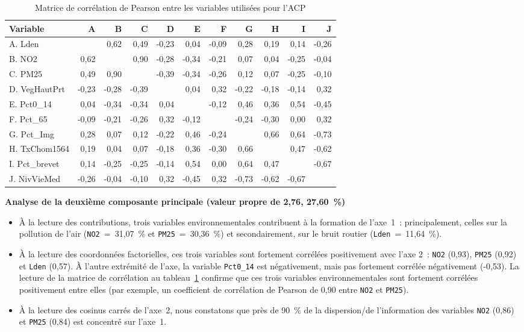 \documentclass[
  11pt,
  french,
]{book}
\providecommand{\tightlist}{%
  \setlength{\itemsep}{0pt}\setlength{\parskip}{0pt}}
\begin{document}
\begin{table}

\caption{\label{tab:dataacpMatriceCorr}Matrice de corrélation de Pearson entre les variables utilisées pour l'ACP}
\centering
\fontsize{8}{10}\selectfont
\begin{tabular}[t]{lrrrrrrrrrr}
\toprule
Variable & A & B & C & D & E & F & G & H & I & J\\
\midrule
A. Lden &  & 0,62 & 0,49 & -0,23 & 0,04 & -0,09 & 0,28 & 0,19 & 0,14 & -0,26\\
B. NO2 & 0,62 &  & 0,90 & -0,28 & -0,34 & -0,21 & 0,07 & 0,04 & -0,25 & -0,04\\
C. PM25 & 0,49 & 0,90 &  & -0,39 & -0,34 & -0,26 & 0,12 & 0,07 & -0,25 & -0,10\\
D. VegHautPrt & -0,23 & -0,28 & -0,39 &  & 0,04 & 0,32 & -0,22 & -0,18 & -0,14 & 0,32\\
E. Pct0\_14 & 0,04 & -0,34 & -0,34 & 0,04 &  & -0,12 & 0,46 & 0,36 & 0,54 & -0,45\\
\addlinespace
F. Pct\_65 & -0,09 & -0,21 & -0,26 & 0,32 & -0,12 &  & -0,24 & -0,30 & 0,00 & 0,32\\
G. Pct\_Img & 0,28 & 0,07 & 0,12 & -0,22 & 0,46 & -0,24 &  & 0,66 & 0,64 & -0,73\\
H. TxChom1564 & 0,19 & 0,04 & 0,07 & -0,18 & 0,36 & -0,30 & 0,66 &  & 0,47 & -0,62\\
I. Pct\_brevet & 0,14 & -0,25 & -0,25 & -0,14 & 0,54 & 0,00 & 0,64 & 0,47 &  & -0,67\\
J. NivVieMed & -0,26 & -0,04 & -0,10 & 0,32 & -0,45 & 0,32 & -0,73 & -0,62 & -0,67 & \\
\bottomrule
\end{tabular}
\end{table}

\textbf{Analyse de la deuxième composante principale (valeur propre de 2,76, 27,60~\%)}

\begin{itemize}
\tightlist
\item
  À la lecture des contributions, trois variables environnementales contribuent à la formation de l'axe~1~: principalement, celles sur la pollution de l'air (\texttt{NO2}~=~31,07~\% et \texttt{PM25}~=~30,36~\%) et secondairement, sur le bruit routier (\texttt{Lden}~=~11,64~\%).
\item
  À la lecture des coordonnées factorielles, ces trois variables sont fortement corrélées positivement avec l'axe 2~: \texttt{NO2} (0,93), \texttt{PM25} (0,92) et \texttt{Lden} (0,57). À l'autre extrémité de l'axe, la variable \texttt{Pct0\_14} est négativement, mais pas fortement corrélée négativement (-0,53). La lecture de la matrice de corrélation au tableau~\ref{tab:dataacpMatriceCorr} confirme que ces trois variables environnementales sont fortement corrélées positivement entre elles (par exemple, un coefficient de corrélation de Pearson de 0,90 entre \texttt{NO2} et \texttt{PM25}).
\item
  À la lecture des cosinus carrés de l'axe~2, nous constatons que près de 90~\% de la dispersion/de l'information des variables \texttt{NO2} (0,86) et \texttt{PM25} (0,84) est concentré sur l'axe~1.
\end{itemize}
\end{document}
